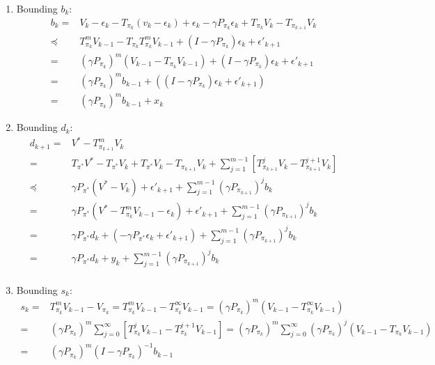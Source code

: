 \documentclass[a4paper]{article}
\begin{document}
\begin{enumerate}
    \item Bounding $ b_k $:
        \begin{align*}
            b_k =& V_k - \epsilon_k - T_{\pi_k}(v_k - \epsilon_k) + \epsilon_k - \gamma P_{\pi_k} \epsilon_k + T_{\pi_k} V_k - T_{\pi_{k+1}} V_k\\
            \preceq& T^{m}_{\pi_k} V_{k-1} - T_{\pi_k}T^{m}_{\pi_k} V_{k-1} + (I - \gamma P_{\pi_k}) \epsilon_k + \epsilon'_{k+1}\\
            =& {(\gamma P_{\pi_k})}^{m} (V_{k-1} - T_{\pi_k} V_{k-1})+ (I - \gamma P_{\pi_k}) \epsilon_k + \epsilon'_{k+1}\\
            =& {(\gamma P_{\pi_k})}^{m} b_{k-1} + ((I - \gamma P_{\pi_k}) \epsilon_k + \epsilon'_{k+1})\\
            =& {(\gamma P_{\pi_k})}^{m} b_{k-1} + x_k
        \end{align*}
    \item Bounding $ d_k $:
        \begin{align*}
            d_{k+1} =& V^* - T^m_{\pi_{k+1}} V_k\\
            =& T_{\pi^*} V^{*} - T_{\pi^*} V_k + T_{\pi^*} V_k - T_{\pi_{k+1}} V_k + \sum^{m-1}_{j=1} \left[ T^j_{\pi_{k+1}}V_k - T^{j+1}_{\pi_{k+1}} V_k \right]\\
            \preceq& \gamma P_{\pi^*} (V^* - V_k) + \epsilon'_{k+1} + \sum^{m-1}_{j=1} {(\gamma P_{\pi_{k+1}})}^{j} b_k\\
            =& \gamma P_{\pi^*} (V^* - T^m_{\pi_{k}}V_{k-1} - \epsilon_k) + \epsilon'_{k+1} + \sum^{m-1}_{j=1} {(\gamma P_{\pi_{k+1}})}^{j} b_k\\
            =& \gamma P_{\pi^*} d_k +(- \gamma P_{\pi^*} \epsilon_k + \epsilon'_{k+1}) + \sum^{m-1}_{j=1} {(\gamma P_{\pi_{k+1}})}^{j} b_k\\
            =& \gamma P_{\pi^*} d_k + y_k + \sum^{m-1}_{j=1} {(\gamma P_{\pi_{k+1}})}^{j} b_k\\
        \end{align*}
    \item Bounding $ s_k $:
        \begin{align*}
            s_k =& T^m_{\pi_k} V_{k-1} - V_{\pi_k} = T^m_{\pi_k} V_{k-1} - T^{\infty}_{\pi_k} V_{{k-1}} 
            = {(\gamma P_{\pi_k})}^{m} \left( V_{k-1} - T^{\infty}_{\pi_k} V_{k-1} \right) \\
            =& {(\gamma P_{\pi_k})}^{m} \sum^{\infty}_{j=0} \left[ T^j_{\pi_k} V_{k-1} - T^{j+1}_{\pi_k} V_{k-1} \right]
            = {(\gamma P_{\pi_k})}^{m} \sum^{\infty}_{j=0} {(\gamma P_{\pi_k})}^{j} (V_{k-1} - T_{\pi_k} V_{k-1})\\
            =& {(\gamma P_{\pi_k})}^{m} {(I - \gamma P_{\pi_k})}^{-1} b_{k-1}
        \end{align*}
\end{enumerate}
\end{document}

